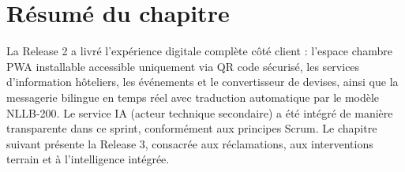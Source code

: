 \section*{Résumé du chapitre}

La Release 2 a livré l'expérience digitale complète côté client : l'espace chambre PWA installable accessible uniquement via QR code sécurisé, les services d'information hôteliers, les événements et le convertisseur de devises, ainsi que la messagerie bilingue en temps réel avec traduction automatique par le modèle NLLB-200. Le service IA (acteur technique secondaire) a été intégré de manière transparente dans ce sprint, conformément aux principes Scrum. Le chapitre suivant présente la Release 3, consacrée aux réclamations, aux interventions terrain et à l'intelligence intégrée.

